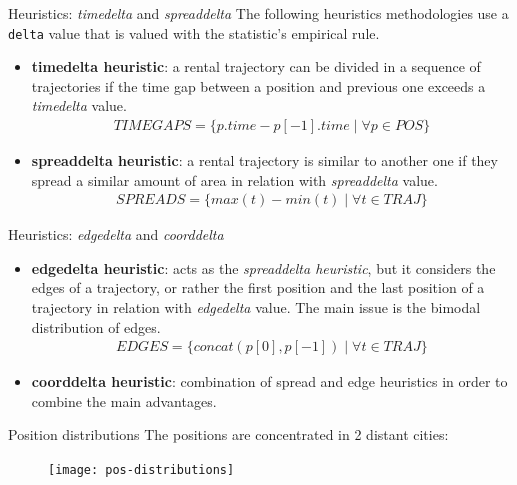 \documentclass{beamer}
\begin{document}
\begin{frame}{Heuristics: \textit{timedelta} and \textit{spreaddelta}}
The following heuristics methodologies use a \texttt{delta} value that is valued with the statistic's empirical rule.
\begin{itemize}
	\item \textbf{timedelta heuristic}: a rental trajectory can be divided in a sequence of trajectories if the time gap between a position and previous one exceeds a \textit{timedelta} value.
	\begin{align}
	TIMEGAPS = \{p.time - p[-1].time \mid \forall p \in POS \}
	\end{align}
	\item \textbf{spreaddelta heuristic}: a rental trajectory is similar to another one if they spread a similar amount of area in relation with \textit{spreaddelta} value. 
	\begin{align}
	SPREADS = \{max(t) - min(t) \mid \forall t \in TRAJ \}
	\end{align}
\end{itemize}
\end{frame}

\begin{frame}{Heuristics: \textit{edgedelta} and \textit{coorddelta}}
\begin{itemize}
	\item \textbf{edgedelta heuristic}: acts as the \textit{spreaddelta heuristic}, but it considers the edges of a trajectory, or rather the first position and the last position of a trajectory in relation with \textit{edgedelta} value. The main issue is the bimodal distribution of edges.
	\begin{align}
	EDGES = \{concat(p[0], p[-1]) \mid \forall t \in TRAJ \}
	\end{align}
	\item \textbf{coorddelta heuristic}: combination of spread and edge heuristics in order to combine the main advantages. 
\end{itemize}
\end{frame}

\begin{frame}{Position distributions}
The positions are concentrated in 2 distant cities:
\begin{figure}[bt]
	\centering
	\texttt{[image: pos-distributions]}
	\label{fig:pos-distributions}
\end{figure}
\end{frame}
\end{document}
